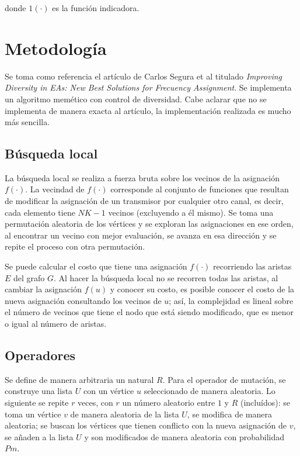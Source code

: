 \documentclass[10pt,a4paper]{article}
\begin{document}
\noindent donde $1 ( \cdot )$ es la función indicadora.

\section{Metodología}

\noindent Se toma como referencia el artículo de Carlos Segura et al titulado \textit{Improving Diversity in EAs: New Best Solutions for Frecuency Assignment}. Se implementa un algoritmo memético con control de diversidad. Cabe aclarar que no se implementa de manera exacta al artículo, la implementación realizada es mucho más sencilla.

\subsection*{Búsqueda local}

\noindent La búsqueda local se realiza a fuerza bruta sobre los vecinos de la asignación $f(\cdot)$. La vecindad de $f(\cdot)$ corresponde al conjunto de funciones que resultan de modificar la asignación de un transmisor por cualquier otro canal, es decir, cada elemento tiene $NK - 1$ vecinos (excluyendo a él mismo). Se toma una permutación aleatoria de los vértices y se exploran las asignaciones en ese orden, al encontrar un vecino con mejor evaluación, se avanza en esa dirección y se repite el proceso con otra permutación. 

\noindent Se puede calcular el costo que tiene una asignación $f( \cdot )$ recorriendo las aristas $E$ del grafo $G$. Al hacer la búsqueda local no se recorren todas las aristas, al cambiar la asignación $f(u)$ y conocer su costo, es posible conocer el costo de la nueva asignación consultando los vecinos de $u$; así, la complejidad es lineal sobre el número de vecinos que tiene el nodo que está siendo modificado, que es menor o igual al número de aristas.

\subsection*{Operadores}

\noindent Se define de manera arbitraria un natural $R$. Para el operador de mutación, se construye una lista $U$ con un vértice $u$ seleccionado de manera aleatoria. Lo siguiente se repite $r$ veces, con $r$ un número aleatorio entre $1$ y $R$ (incluídos): se toma un vértice $v$ de manera aleatoria de la lista $U$, se modifica de manera aleatoria; se buscan los vértices que tienen conflicto con la nueva asignación de $v$, se añaden a la lista $U$ y son modificados de manera aleatoria con probabilidad $Pm$. 
\end{document}
